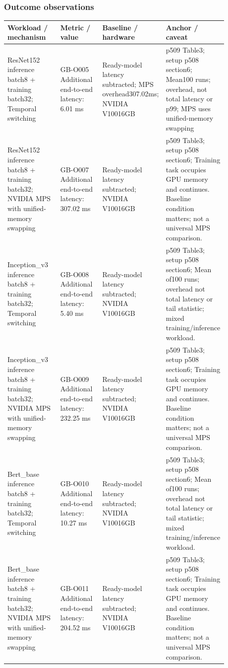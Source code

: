 \documentclass[12pt,a4paper]{article}
\begin{document}
\subsubsection*{Outcome observations}
\begin{longtable}{p{0.24\linewidth}p{0.19\linewidth}p{0.2\linewidth}p{0.25\linewidth}}
\toprule
Workload /\allowbreak{} mechanism & Metric /\allowbreak{} value & Baseline /\allowbreak{} hardware & Anchor /\allowbreak{} caveat\\\midrule
\endhead
ResNet152 inference batch8 + training batch32; Temporal switching & GB-O005 Additional end-to-end latency: 6.01 ms & Ready-model latency subtracted; MPS overhead307.02ms; NVIDIA V10016GB & p509 Table3; setup p508 section6; Mean100 runs; overhead, not total latency or p99; MPS uses unified-memory swapping\\
ResNet152 inference batch8 + training batch32; NVIDIA MPS with unified-memory swapping & GB-O007 Additional end-to-end latency: 307.02 ms & Ready-model latency subtracted; NVIDIA V10016GB & p509 Table3; setup p508 section6; Training task occupies GPU memory and continues. Baseline condition matters; not a universal MPS comparison.\\
Inception\_v3 inference batch8 + training batch32; Temporal switching & GB-O008 Additional end-to-end latency: 5.40 ms & Ready-model latency subtracted; NVIDIA V10016GB & p509 Table3; setup p508 section6; Mean of100 runs; overhead not total latency or tail statistic; mixed training/\allowbreak{}inference workload.\\
Inception\_v3 inference batch8 + training batch32; NVIDIA MPS with unified-memory swapping & GB-O009 Additional end-to-end latency: 232.25 ms & Ready-model latency subtracted; NVIDIA V10016GB & p509 Table3; setup p508 section6; Training task occupies GPU memory and continues. Baseline condition matters; not a universal MPS comparison.\\
Bert\_base inference batch8 + training batch32; Temporal switching & GB-O010 Additional end-to-end latency: 10.27 ms & Ready-model latency subtracted; NVIDIA V10016GB & p509 Table3; setup p508 section6; Mean of100 runs; overhead not total latency or tail statistic; mixed training/\allowbreak{}inference workload.\\
Bert\_base inference batch8 + training batch32; NVIDIA MPS with unified-memory swapping & GB-O011 Additional end-to-end latency: 204.52 ms & Ready-model latency subtracted; NVIDIA V10016GB & p509 Table3; setup p508 section6; Training task occupies GPU memory and continues. Baseline condition matters; not a universal MPS comparison.\\

\end{longtable}
\end{document}
